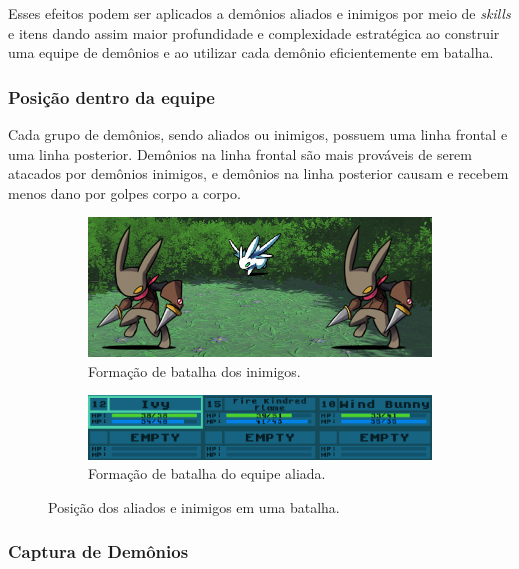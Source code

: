 \documentclass[
	12pt,				%
	openright,			%
	twoside,			%
	a4paper,			%
	english,			%
	french,				%
	spanish,			%
	brazil				%
	]{abntex2}
\begin{document}
Esses efeitos podem ser aplicados a demônios aliados e inimigos por meio de \emph{skills} e itens dando assim maior profundidade e complexidade estratégica ao construir uma equipe de demônios e ao utilizar cada demônio eficientemente em batalha. 


\subsubsection{Posição dentro da equipe}

Cada grupo de demônios, sendo aliados ou inimigos, possuem uma linha frontal e uma linha posterior. Demônios na linha frontal são mais prováveis  de serem atacados por demônios inimigos, e demônios na linha posterior causam e recebem menos dano por golpes corpo a corpo.

\begin{figure}[h!]
  \centering
  \begin{subfigure}[b]{0.5\linewidth}
    \includegraphics[width=\linewidth]{enemyformation.jpg}
     \caption{Formação de batalha dos inimigos.}
  \end{subfigure}
  \begin{subfigure}[b]{0.5\linewidth}
    \includegraphics[width=\linewidth]{partyformation.jpg}
    \caption{Formação de batalha do equipe aliada.}
  \end{subfigure}
  \caption{Posição dos aliados e inimigos em uma batalha.}
  \label{fig:battle3}
\end{figure}

\subsubsection{Captura de Demônios}
\end{document}
